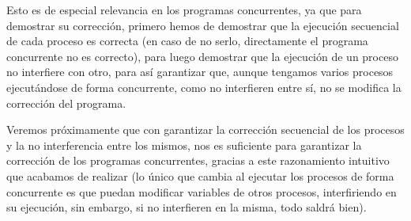 Esto es de especial relevancia en los programas concurrentes, ya que para demostrar su corrección, primero hemos de demostrar que la ejecución secuencial de cada proceso es correcta (en caso de no serlo, directamente el programa concurrente no es correcto), para luego demostrar que la ejecución de un proceso no interfiere con otro, para así garantizar que, aunque tengamos varios procesos ejecutándose de forma concurrente, como no interfieren entre sí, no se modifica la corrección del programa.

Veremos próximamente que con garantizar la corrección secuencial de los procesos y la no interferencia entre los mismos, nos es suficiente para garantizar la corrección de los programas concurrentes, gracias a este razonamiento intuitivo que acabamos de realizar (lo único que cambia al ejecutar los procesos de forma concurrente es que puedan modificar variables de otros procesos, interfiriendo en su ejecución, sin embargo, si no interfieren en la misma, todo saldrá bien).

